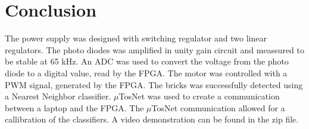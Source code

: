 \section{Conclusion}

The power supply was designed with switching regulator and two linear regulators.
The photo diodes was amplified in unity gain circuit and meassured to be stable at 65 kHz.
An ADC was used to convert the voltage from the photo diode to a digital value, read by the FPGA.
The motor was controlled with a PWM signal, generated by the FPGA.
The bricks was successfully detected using a Nearest Neighbor classifier.
$\mu$TosNet was used to create a communication between a laptop and the FPGA.
The $\mu$TosNet communication allowed for a callibration of the classifiers.
A video demonstration can be found in the zip file.
